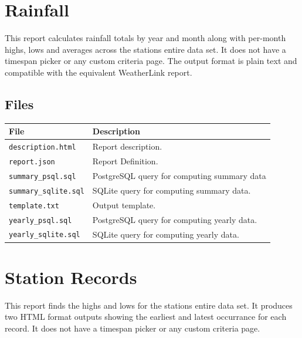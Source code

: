 \documentclass[a4paper,10pt]{book}
\begin{document}
\section{Rainfall}
This report calculates rainfall totals by year and month along with per-month highs, lows and averages across the stations entire data set. It does not have a timespan picker or any custom criteria page. The output format is plain text and compatible with the equivalent WeatherLink report.

\subsection{Files}
\begin{tabular}{p{3.8cm} p{10cm}}
\hline
\textbf{File} & \textbf{Description} \\
\hline
\verb|description.html| & Report description. \\
\verb|report.json| & Report Definition.\\
\verb|summary_psql.sql| & PostgreSQL query for computing summary data\\
\verb|summary_sqlite.sql| & SQLite query for computing summary data.\\
\verb|template.txt| & Output template.\\
\verb|yearly_psql.sql| & PostgreSQL query for computing yearly data.\\
\verb|yearly_sqlite.sql| & SQLite query for computing yearly data.\\
\hline
\end{tabular}

\section{Station Records}
This report finds the highs and lows for the stations entire data set. It produces two HTML format outputs showing the earliest and latest occurrance for each record. It does not have a timespan picker or any custom criteria page.
\end{document}
